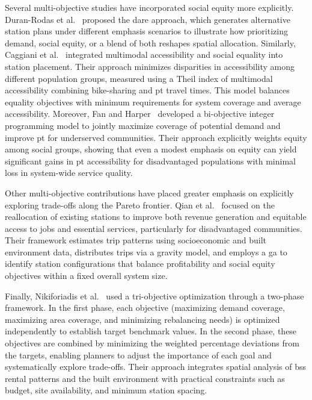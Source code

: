 Several multi-objective studies have incorporated social equity more explicitly. Duran-Rodas et al.~\cite{Duran-Rodas2021} proposed the \ac{dare} approach, which generates alternative station plans under different emphasis scenarios to illustrate how prioritizing demand, social equity, or a blend of both reshapes spatial allocation. Similarly, Caggiani et al.~\cite{Caggiani2020} integrated multimodal accessibility and social equality into station placement. Their approach minimizes disparities in accessibility among different population groups, measured using a Theil index of multimodal accessibility combining bike-sharing and \ac{pt} travel times. This model balances equality objectives with minimum requirements for system coverage and average accessibility. Moreover, Fan and Harper~\cite{Fan2024} developed a bi-objective integer programming model to jointly maximize coverage of potential demand and improve \ac{pt} for underserved communities. Their approach explicitly weights equity among social groups, showing that even a modest emphasis on equity can yield significant gains in \ac{pt} accessibility for disadvantaged populations with minimal loss in system-wide service quality.

Other multi-objective contributions have placed greater emphasis on explicitly exploring trade-offs along the Pareto frontier. Qian et al.~\cite{Qian2022} focused on the reallocation of existing stations to improve both revenue generation and equitable access to jobs and essential services, particularly for disadvantaged communities. Their framework estimates trip patterns using socioeconomic and built environment data, distributes trips via a gravity model, and employs a \ac{ga} to identify station configurations that balance profitability and social equity objectives within a fixed overall system size. 

Finally, Nikiforiadis et al.~\cite{Nikiforiadis2021} used a tri-objective optimization through a two-phase framework. In the first phase, each objective (maximizing demand coverage, maximizing area coverage, and minimizing rebalancing needs) is optimized independently to establish target benchmark values. In the second phase, these objectives are combined by minimizing the weighted percentage deviations from the targets, enabling planners to adjust the importance of each goal and systematically explore trade-offs. Their approach integrates spatial analysis of \ac{bss} rental patterns and the built environment with practical constraints such as budget, site availability, and minimum station spacing.

